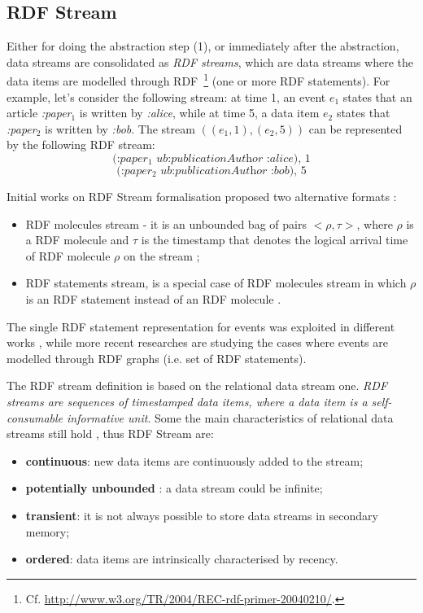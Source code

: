 \subsection{RDF Stream}\label{sec:rdfstream}

Either for doing the abstraction step (1), or immediately after the abstraction, data streams are consolidated as \textit{RDF streams}, which are data streams where the data items are modelled through RDF~\footnote{Cf. \url{http://www.w3.org/TR/2004/REC-rdf-primer-20040210/}.} (one or more RDF statements). For example, let's consider the following stream: at time 1, an event $e_1$ states that an article \textit{:paper$_1$} is written by \textit{:alice}, while at time 5, a data item $e_2$ states that \textit{:paper$_2$} is written by \textit{:bob}. The stream $((e_1,1),(e_2,5))$ can be represented by the following RDF stream:
\[\textit{(:paper$_1$ ub:publicationAuthor :alice), 1}\]
\[\textit{(:paper$_2$ ub:publicationAuthor :bob), 5}\]

Initial works on RDF Stream formalisation proposed two alternative formats \cite{DBLP:conf/fis/ValleCBBC08}:
\begin{itemize}
\item RDF molecules stream - it is an unbounded bag of pairs $< \rho, \tau >$, where $\rho$ is a RDF molecule \cite{TrackingMolecules} and $\tau$ is the timestamp that denotes the logical arrival time of RDF molecule $\rho$ on the stream \cite{DBLP:conf/fis/ValleCBBC08};
\item RDF statements stream, is a special case of RDF molecules stream in which $\rho$ is an RDF statement instead of an RDF molecule  .
\end{itemize} 

The single RDF statement representation for events was exploited in different works  \cite{Barbieri2010,Lephuoc2011}, while more recent researches \cite{DBLP:conf/semweb/BalduiniVDTPC13} are studying the cases where events are modelled through RDF graphs (i.e. set of RDF statements). 

The  RDF stream  definition is based on the relational data stream one. \textit{RDF streams are sequences of timestamped data items, where a data item is a self- consumable informative unit}. Some the main characteristics of relational data streams still hold \cite{DBLP:conf/pods/BabcockBDMW02}, thus RDF Stream are:
\begin{itemize}
\item \textbf{continuous}: new data items are continuously added to the stream;
\item \textbf{potentially unbounded} : a data stream could be infinite;
\item \textbf{transient}: it is not always possible to store data streams in secondary memory;
\item \textbf{ordered}: data items are intrinsically characterised by recency.
\end{itemize}

